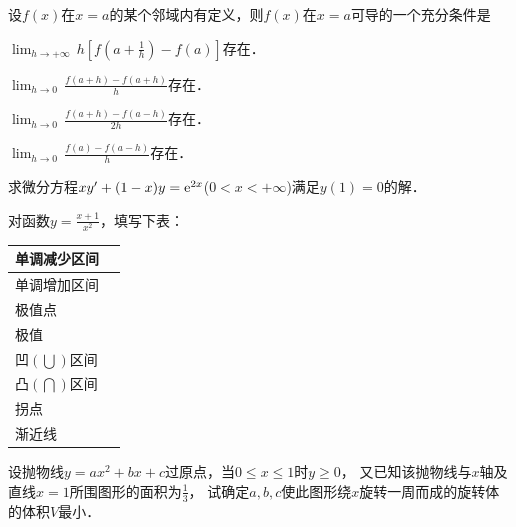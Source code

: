 \documentclass[plain,noanswer,medmath]{../../template/jnuexam}
\begin{document}
\begin{problem}
设$f(x)$在$x=a$的某个邻域内有定义，则$f(x)$在$x=a$可导的一个充分条件是 \pickout{}
\begin{abcd}
\item $\lim_{h\to +\infty}\,h[f(a+\frac{1}{h})-f(a)]$存在．
\item $\lim_{h\to 0}\,\frac{f(a+h)-f(a+h)}{h}$存在．
\item $\lim_{h\to 0}\,\frac{f(a+h)-f(a-h)}{2h}$存在．
\item $\lim_{h\to 0}\,\frac{f(a)-f(a-h)}{h}$存在．
\end{abcd}
\end{problem}



\begin{problem}
求微分方程$xy'+(1-x)y=\mathrm{e}^{2x}$($0<x<+\infty$)满足$y(1)=0$的解．
\end{problem}









\begin{problem}
对函数$y=\frac{x+1}{x^2}$，填写下表： \par
\begin{tabularx}{\linewidth}{|>{\qquad}X|>{\qquad}X|}
\hline
  单调减少区间 &  \\
\hline
  单调增加区间 &  \\
\hline
  极值点 &  \\
\hline
  极值 &  \\
\hline
  凹$\left(\bigcup\right)$区间 &  \\
\hline
  凸$\left(\bigcap\right)$区间 &  \\
\hline
  拐点 &  \\
\hline
  渐近线 &  \\
\hline
\end{tabularx}
\end{problem}



\begin{problem}
设抛物线$y=ax^2+bx+c$过原点，当$0\le x\le 1$时$y\ge 0$，
又已知该抛物线与$x$轴及直线$x=1$所围图形的面积为$\frac{1}{3}$，
试确定$a,b,c$使此图形绕$x$旋转一周而成的旋转体的体积$V$最小．
\end{problem}
\end{document}
